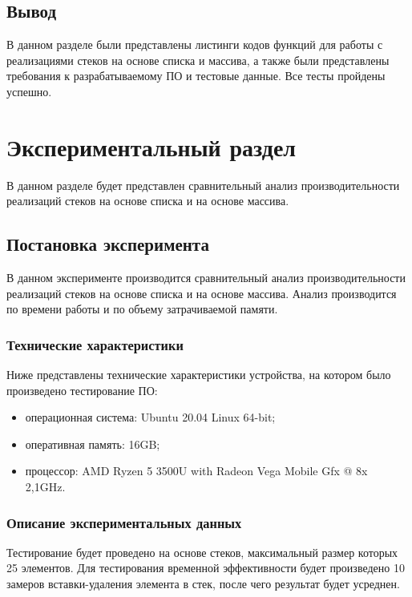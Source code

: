 \section{Вывод}

В данном разделе были представлены листинги кодов функций для работы с реализациями стеков на основе списка и массива, а также были представлены требования к разрабатываемому ПО и тестовые данные. Все тесты пройдены успешно.

\chapter{Экспериментальный раздел}

В данном разделе будет представлен сравнительный анализ производительности реализаций стеков на основе списка и на основе массива.

\section{Постановка эксперимента}

В данном эксперименте производится сравнительный анализ производительности реализаций стеков на основе списка и на основе массива. Анализ производится по времени работы и по объему затрачиваемой памяти.

\subsection{Технические характеристики}

Ниже представлены технические характеристики устройства, на котором было произведено тестирование ПО:

\begin{itemize}[$\bullet$]
	\item операционная система: Ubuntu 20.04 Linux 64-bit;
	\item оперативная память: 16GB;
	\item процессор: AMD Ryzen 5 3500U with Radeon Vega Mobile Gfx @ 8x 2,1GHz.
\end{itemize}

\subsection{Описание экспериментальных данных}

Тестирование будет проведено на основе стеков, максимальный размер которых 25 элементов. Для тестирования временной эффективности будет произведено 10 замеров вставки-удаления элемента в стек, после чего результат будет усреднен.

